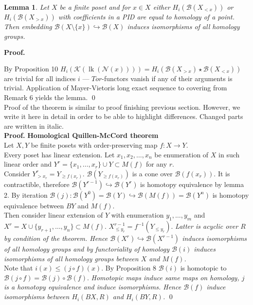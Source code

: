 \documentclass[a4paper, 12pt]{article}
\newtheorem{lemma}{Lemma}
\theoremstyle{definition}
\theoremstyle{remark}
\newenvironment{pf}{\noindent\textbf{Proof.}}{\qed}
\renewcommand{\leq}{\leqslant}
\renewcommand{\geq}{\geqslant}
\begin{document}
\begin{lemma}
  Let $X$ be a finite poset and for $x \in X$ either $H_i(\mathcal{B}(X_{< x}))$ or $H_i(\mathcal{B}(X_{> x}))$ with coefficients in a PID are equal to homology of a point. Then embedding $\mathcal{B}(X \setminus \{x\}) \hookrightarrow \mathcal{B}(X)$ induces isomorphisms of all homology groups.
\end{lemma}

\begin{pf} ~ \par
  By Proposition 10 $H_i(\mathcal{K}(\operatorname{lk}(\mathcal{N}(x)))) = H_i(\mathcal{B}(X_{>x}) \star \mathcal{B}(X_{<x}))$ are trivial for all indices $i$ --- $Tor$-functors vanish if any of their arguments is trivial.
  Application of Mayer-Vietoris long exact sequence to covering from Remark 6 yields the lemma.
\end{pf}\\

Proof of the theorem is similar to proof finishing previous section. However, we write it here in detail in order to be able to highlight differences. Changed parts are written in italic.\\

\begin{pf} \textbf{Homological Quillen-McCord theorem}\\
Let $X, Y$ be finite posets with order-preserving map $f : X \to Y$.\\

Every poset has linear extension. Let $x_1, x_2, \ldots, x_n$ be enumeration of $X$ in such linear order and $Y^r = \{x_1,\ldots,x_r\} \cup Y \subset M(f)$ for any $r$.\\

Consider $Y^r_{>x_r} = Y_{\geq f(x_r)}$. $\mathcal{B}(Y_{\geq f(x_r)})$ is a cone over $\mathcal{B}(f(x_r))$. It is contractible, therefore $\mathcal{B}(Y^{r-1}) \hookrightarrow \mathcal{B}(Y^{r})$ is homotopy equivalence by lemma 2. By iteration $\mathcal{B}(j) : \mathcal{B}(Y^{0}) = \mathcal{B}(Y) \hookrightarrow \mathcal{B}(M(f)) = \mathcal{B}(Y^n)$ is homotopy equivalence between $BY$ and $M(f)$.\\

Then consider linear extension of $Y$ with enumeration $y_1,\ldots,y_m$ and $X^r = X \cup \{y_{r+1},\ldots,y_n\} \subset M(f)$. $X^{r-1}_{\leq y_r} = f^{-1}(Y_{\leqslant y_r})$. \textit{Latter is acyclic over $R$ by condition of the theorem. Hence $\mathcal{B}(X^{r}) \hookrightarrow \mathcal{B}(X^{r-1})$ induces isomorphisms of all homology groups and by functoriality of homology $\mathcal{B}(i)$ induces isomorphisms of all homology groups between $X$ and $M(f)$.}\\

Note that $i(x) \leqslant (j \circ f)(x)$. By Proposition 8 $\mathcal{B}(i)$ is homotopic to $\mathcal{B}(j \circ f) = \mathcal{B}(j) \circ \mathcal{B}(f)$. \textit{Homotopic maps induce same maps on homology, $j$ is a homotopy equivalence and induce isomorphisms. Hence $\mathcal{B}(f)$ induce isomorphisms between $H_i(BX,R)$ and $H_i(BY,R)$.}
\end{pf}\\
\end{document}

